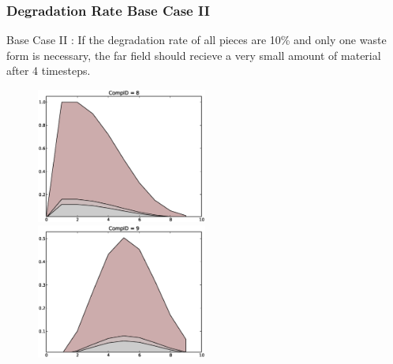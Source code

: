 \begin{frame}
  \frametitle{Degradation Rate Base Case II}
  Base Case II : If the degradation rate of all pieces are 10\% and only one 
  waste form is necessary, the far field should recieve a very small amount
  of material after 4 timesteps.

  \begin{figure}[htbp!]
    \begin{center}
      \includegraphics[width=0.5\textwidth]{cyder/images/deg_comp8.eps}
      \includegraphics[width=0.5\textwidth]{cyder/images/deg_comp9.eps}
    \end{center}
  \end{figure}
\end{frame}

